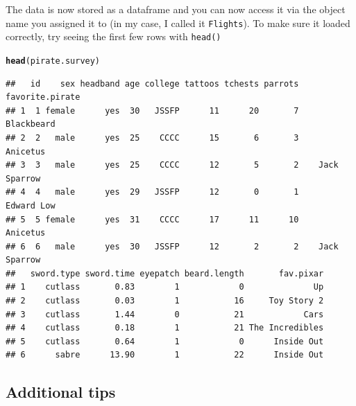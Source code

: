 \documentclass{tufte-book}\usepackage[]{graphicx}\usepackage[]{color}
\makeatletter
\newcommand{\hlstd}[1]{\textcolor[rgb]{0.345,0.345,0.345}{#1}}%
\newcommand{\hlkwd}[1]{\textcolor[rgb]{0.737,0.353,0.396}{\textbf{#1}}}%
\newenvironment{kframe}{%
 \def\at@end@of@kframe{}%
 \ifinner\ifhmode%
  \def\at@end@of@kframe{\end{minipage}}%
  \begin{minipage}{\columnwidth}%
 \fi\fi%
 \def\FrameCommand##1{\hskip\@totalleftmargin \hskip-\fboxsep
 \colorbox{shadecolor}{##1}\hskip-\fboxsep
     \hskip-\linewidth \hskip-\@totalleftmargin \hskip\columnwidth}%
 \MakeFramed {\advance\hsize-\width
   \@totalleftmargin\z@ \linewidth\hsize
   \@setminipage}}%
 {\par\unskip\endMakeFramed%
 \at@end@of@kframe}
\newenvironment{knitrout}{}{} %
\makeatother
\begin{document}
The data is now stored as a dataframe and you can now access it via the object name you assigned it to (in my case, I called it \texttt{Flights}). To make sure it loaded correctly, try seeing the first few rows with \texttt{head()}

\vspace{5mm}
\begin{minipage}{18cm}
\begin{footnotesize}
\begin{knitrout}
\color{fgcolor}\begin{kframe}
\begin{alltt}
\hlkwd{head}\hlstd{(pirate.survey)}
\end{alltt}
\begin{verbatim}
##   id    sex headband age college tattoos tchests parrots favorite.pirate
## 1  1 female      yes  30   JSSFP      11      20       7      Blackbeard
## 2  2   male      yes  25    CCCC      15       6       3        Anicetus
## 3  3   male      yes  25    CCCC      12       5       2    Jack Sparrow
## 4  4   male      yes  29   JSSFP      12       0       1      Edward Low
## 5  5 female      yes  31    CCCC      17      11      10        Anicetus
## 6  6   male      yes  30   JSSFP      12       2       2    Jack Sparrow
##   sword.type sword.time eyepatch beard.length       fav.pixar
## 1    cutlass       0.83        1            0              Up
## 2    cutlass       0.03        1           16     Toy Story 2
## 3    cutlass       1.44        0           21            Cars
## 4    cutlass       0.18        1           21 The Incredibles
## 5    cutlass       0.64        1            0      Inside Out
## 6      sabre      13.90        1           22      Inside Out
\end{verbatim}
\end{kframe}
\end{knitrout}
\end{footnotesize}
\end{minipage}

\subsection{Additional tips}
\end{document}
